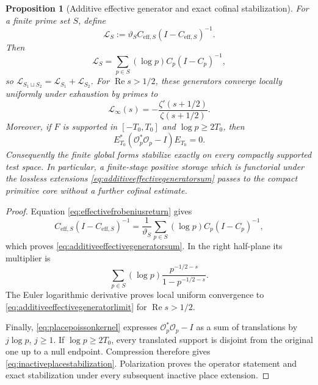 \documentclass[11pt]{amsart}
\newtheorem{proposition}[theorem]{Proposition}
\theoremstyle{definition}
\theoremstyle{remark}
\begin{document}
\begin{proposition}[Additive effective generator and exact cofinal
stabilization]
\label{prop:effectivecofinalgenerator}
For a finite prime set $S$, define
\begin{equation}\label{eq:additiveeffectivegenerator}
 \mathcal L_S:=\vartheta_SC_{\mathrm{eff},S}
                    (I-C_{\mathrm{eff},S})^{-1}.
\end{equation}
Then
\begin{equation}\label{eq:additiveeffectivegeneratorsum}
 \mathcal L_S
 =\sum_{p\in S}(\log p)C_p(I-C_p)^{-1},
\end{equation}
so $\mathcal L_{S_1\sqcup S_2}=\mathcal L_{S_1}+\mathcal L_{S_2}$.
For $\operatorname{Re}s>1/2$, these generators converge locally uniformly
under exhaustion by primes to
\begin{equation}\label{eq:additiveeffectivegeneratorlimit}
 \mathcal L_\infty(s)
 =-\frac{\zeta'(s+1/2)}{\zeta(s+1/2)}.
\end{equation}
Moreover, if $F$ is supported in $[-T_0,T_0]$ and
$\log p\ge2T_0$, then
\begin{equation}\label{eq:inactiveplacestabilization}
 E_{T_0}^*(\mathcal O_p^*\mathcal O_p-I)E_{T_0}=0.
\end{equation}
Consequently the finite global forms stabilize exactly on every compactly
supported test space.  In particular, a finite-stage positive storage which
is functorial under the lossless extensions
\eqref{eq:additiveeffectivegeneratorsum} passes to the compact primitive
core without a further cofinal estimate.
\end{proposition}

\begin{proof}
Equation \eqref{eq:effectivefrobeniusreturn} gives
\[
 C_{\mathrm{eff},S}(I-C_{\mathrm{eff},S})^{-1}
 =\frac1{\vartheta_S}\sum_{p\in S}
      (\log p)C_p(I-C_p)^{-1},
\]
which proves \eqref{eq:additiveeffectivegeneratorsum}.  In the right
half-plane its multiplier is
\[
 \sum_{p\in S}(\log p)
    \frac{p^{-1/2-s}}{1-p^{-1/2-s}}.
\]
The Euler logarithmic derivative proves local uniform convergence to
\eqref{eq:additiveeffectivegeneratorlimit} for $\operatorname{Re}s>1/2$.

Finally, \eqref{eq:placepoissonkernel} expresses
$\mathcal O_p^*\mathcal O_p-I$ as a sum of translations by
$j\log p$, $j\ge1$.  If $\log p\ge2T_0$, every translated support is
disjoint from the original one up to a null endpoint.  Compression therefore
gives \eqref{eq:inactiveplacestabilization}.  Polarization proves the
operator statement and exact stabilization under every subsequent inactive
place extension.
\end{proof}
\end{document}

